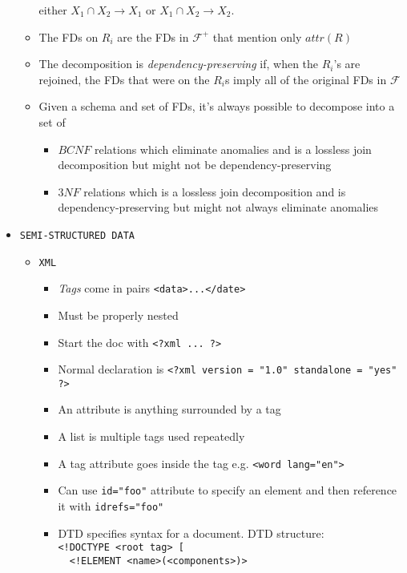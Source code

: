 \documentclass[landscape,8pt]{extarticle}
\newcommand{\code}{\lstinline}
\begin{document}
\begin{multicols}{4}
\begin{itemize}
\begin{itemize}
        either $X_1 \cap X_2 \rightarrow X_1$ or $X_1 \cap X_2 \rightarrow X_2$.
        \item The FDs on $R_i$ are the FDs in $\mathcal{F}^+$ that mention only $attr(R)$
        \item The decomposition is \emph{dependency-preserving} if, when the $R_i$'s are rejoined,
        the FDs that were on the $R_i$s imply all of the original FDs in $\mathcal{F}$
        \item Given a schema and set of FDs, it's always possible to decompose into a set of 
        \begin{itemize}
            \item $BCNF$ relations which eliminate anomalies and is a lossless join decomposition
            but might not be dependency-preserving
            \item $3NF$ relations which is a lossless join decomposition and is
            dependency-preserving but might not always eliminate anomalies
        \end{itemize}
    \end{itemize}
    \item \code{SEMI-STRUCTURED DATA}
    \begin{itemize}
        \item \code{XML}
        \begin{itemize}
            \item \emph{Tags} come in pairs \code{<data>...</date>}
            \item Must be properly nested
            \item Start the doc with \code{<?xml ... ?>}
            \item Normal declaration is \code{<?xml version = "1.0" standalone = "yes" ?>}
            \item An attribute is anything surrounded by a tag
            \item A list is multiple tags used repeatedly
            \item A tag attribute goes inside the tag e.g. \code{<word lang="en">}
            \item Can use \code{id="foo"} attribute to specify an element and then reference it with
            \code{idrefs="foo"}
            \item DTD specifies syntax for a document. DTD structure:\\
\code{<!DOCTYPE <root tag> [}\\
\code{  <!ELEMENT <name>(<components>)>}\\

\end{itemize}
\end{itemize}
\end{itemize}
\end{multicols}
\end{document}
